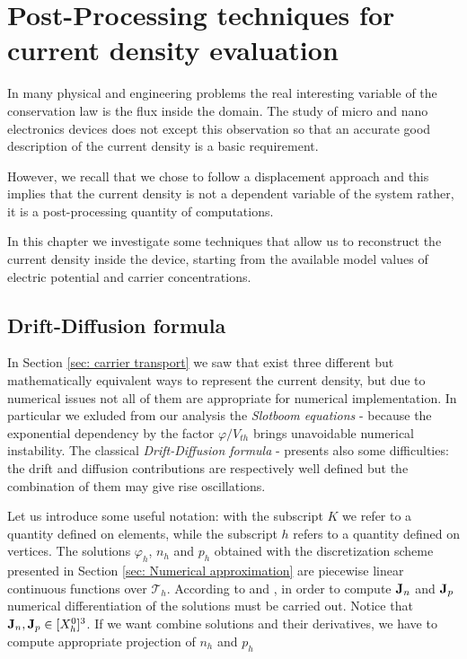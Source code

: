 \chapter{Post-Processing techniques for current density evaluation}

In many physical and engineering problems the real interesting variable of the conservation law is the flux inside the domain. The study of micro and nano electronics devices does not except this observation so that an accurate good description of the current density is a basic requirement.

However, we recall that we chose to follow a displacement approach and this implies that the current density is not a dependent variable of the system rather, it is a post-processing quantity of computations.

In this chapter we investigate some techniques that allow us to reconstruct the current density inside the device, starting from the available model values of electric potential and carrier concentrations.


\section{Drift-Diffusion formula}

In Section \ref{sec: carrier transport} we saw that exist three different but mathematically equivalent ways to represent the current density, but due to numerical issues not all of them are appropriate for numerical implementation. In particular we exluded from our analysis the \textit{Slotboom equations} - because  the exponential dependency by the factor $\varphi / V_{th}$ brings unavoidable numerical instability. 
The classical \textit{Drift-Diffusion formula} - presents also some difficulties: the drift and diffusion contributions are respectively well defined but the combination of them may give rise oscillations.

Let us introduce some useful notation: with the subscript $K$  we refer to a quantity defined on elements, while the subscript $h$ refers to a quantity defined on vertices. The solutions $\varphi_h$, $n_h$ and $p_h$ obtained with the discretization scheme presented in Section \ref{sec: Numerical approximation} are piecewise linear continuous functions over $\mathcal{T}_h$. According to   and ,  in order to compute $\mathbf{J}_n$ and $\mathbf{J}_p$ numerical differentiation of the solutions must be carried out. Notice that $\mathbf{J}_{n},\mathbf{J}_{p} \in [X_h^0]^3$. If we want combine solutions and their derivatives, we have to compute appropriate projection of $n_h$ and $p_h$
 

